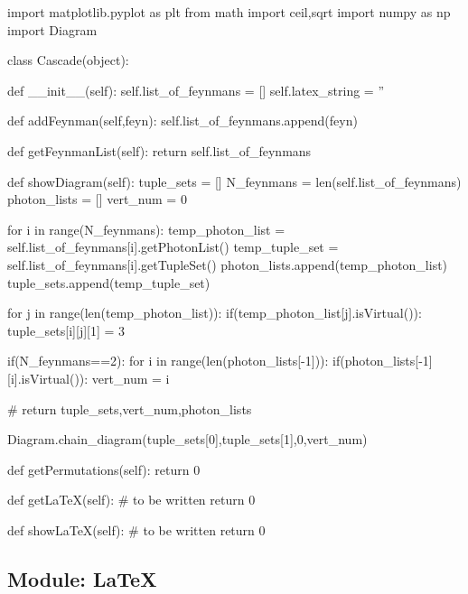 \documentclass[11pt,a4paper,notitlepage]{article}
\begin{document}
\begin{code}
import matplotlib.pyplot as plt
from math import ceil,sqrt
import numpy as np
import Diagram

class Cascade(object):
    
    def __init__(self):
        self.list_of_feynmans = []
        self.latex_string = ''
    
    def addFeynman(self,feyn):
        self.list_of_feynmans.append(feyn)
    
    def getFeynmanList(self):
        return self.list_of_feynmans

    def showDiagram(self):
        tuple_sets = []
        N_feynmans = len(self.list_of_feynmans)
        photon_lists = []
        vert_num = 0
        
        for i in range(N_feynmans):
            temp_photon_list = self.list_of_feynmans[i].getPhotonList()
            temp_tuple_set = self.list_of_feynmans[i].getTupleSet()
            photon_lists.append(temp_photon_list)
            tuple_sets.append(temp_tuple_set)
            
            for j in range(len(temp_photon_list)):
                if(temp_photon_list[j].isVirtual()):
                    tuple_sets[i][j][1] = 3
    
        if(N_feynmans==2):
            for i in range(len(photon_lists[-1])):
                if(photon_lists[-1][i].isVirtual()):
                    vert_num = i
        
#        return tuple_sets,vert_num,photon_lists

        Diagram.chain_diagram(tuple_sets[0],tuple_sets[1],0,vert_num)

    def getPermutations(self):
        return 0

    def getLaTeX(self):
        # to be written
        return 0
    
    def showLaTeX(self):
        # to be written
        return 0
\end{code}

\subsection{Module: LaTeX}
\end{document}
